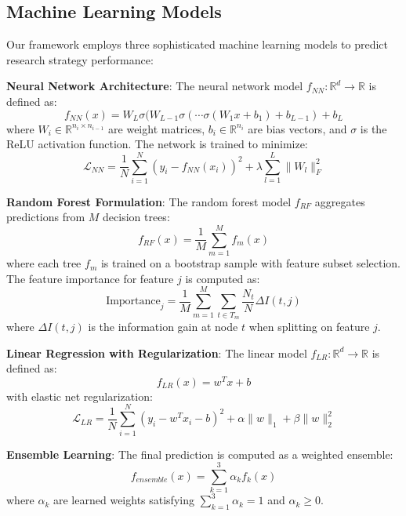 \documentclass[letterpaper]{article} %
\begin{document}
\subsection{Machine Learning Models}

Our framework employs three sophisticated machine learning models to predict research strategy performance:

\textbf{Neural Network Architecture}: The neural network model $f_{NN}: \mathbb{R}^d \rightarrow \mathbb{R}$ is defined as:
\begin{equation}
f_{NN}(x) = W_L \sigma(W_{L-1} \sigma(\cdots \sigma(W_1 x + b_1) + b_{L-1}) + b_L
\end{equation}
where $W_i \in \mathbb{R}^{n_i \times n_{i-1}}$ are weight matrices, $b_i \in \mathbb{R}^{n_i}$ are bias vectors, and $\sigma$ is the ReLU activation function. The network is trained to minimize:
\begin{equation}
\mathcal{L}_{NN} = \frac{1}{N} \sum_{i=1}^{N} \left(y_i - f_{NN}(x_i)\right)^2 + \lambda \sum_{l=1}^{L} \|W_l\|_F^2
\end{equation}

\textbf{Random Forest Formulation}: The random forest model $f_{RF}$ aggregates predictions from $M$ decision trees:
\begin{equation}
f_{RF}(x) = \frac{1}{M} \sum_{m=1}^{M} f_m(x)
\end{equation}
where each tree $f_m$ is trained on a bootstrap sample with feature subset selection. The feature importance for feature $j$ is computed as:
\begin{equation}
\text{Importance}_j = \frac{1}{M} \sum_{m=1}^{M} \sum_{t \in T_m} \frac{N_t}{N} \Delta I(t, j)
\end{equation}
where $\Delta I(t, j)$ is the information gain at node $t$ when splitting on feature $j$.

\textbf{Linear Regression with Regularization}: The linear model $f_{LR}: \mathbb{R}^d \rightarrow \mathbb{R}$ is defined as:
\begin{equation}
f_{LR}(x) = w^T x + b
\end{equation}
with elastic net regularization:
\begin{equation}
\mathcal{L}_{LR} = \frac{1}{N} \sum_{i=1}^{N} (y_i - w^T x_i - b)^2 + \alpha \|w\|_1 + \beta \|w\|_2^2
\end{equation}

\textbf{Ensemble Learning}: The final prediction is computed as a weighted ensemble:
\begin{equation}
f_{ensemble}(x) = \sum_{k=1}^{3} \alpha_k f_k(x)
\end{equation}
where $\alpha_k$ are learned weights satisfying $\sum_{k=1}^{3} \alpha_k = 1$ and $\alpha_k \geq 0$.
\end{document}
